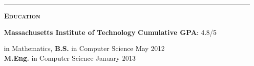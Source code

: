 \documentclass[11 pt]{article}
\begin{document}
\vspace{8pt}

\hrule

\begin{center}\begin{Large}\textsc{\textbf{Education}\\}\end{Large}
\end{center}

\noindent \textbf{Massachusetts Institute of Technology} \hfill \textbf{Cumulative GPA}: 4.8/5 \\
\begin{small}
 in Mathematics, {\bf B.S.} in Computer Science \hfill May 2012 \\
{\bf M.Eng.} in Computer Science \hfill January 2013 \\
\end{small}


\begin{comment}
\begin{small}

 \noindent \textbf{Relevant Technical Coursework:}

\textbf{Physics}:
Physics III (Vibrations and Waves); Classical Mechanics II

 \textbf{Economics}:
 Microeconomics; %
 Networks;
 Robust Mechanism Design;
Game Theory %
Public Finance and Public Policy

 \textbf{Math}:
 \noindent Real Analysis; %
 Linear Algebra and Group Theory; %
 Differential Forms; %
 Combinatorial Analysis;
 Probability and Random Variables;
 Differential Equations;
 Seminar in Logic

\textbf{CS Theory}:
 Networks;
 Design and Analysis of Algorithms; %
 Approximation Algorithms;
 Sub-Linear Algorithms;
 Complexity Theory I and II; %
 Advanced Complexity Theory;
 Quantum Complexity Theory;
 Combinatorial Optimization;
 Cryptography I and II; %
 Modern Developments in Cryptography
 Artificial Intelligence;

 \textbf{CS Systems}:
Intro to EECS I and II;
 Computer Systems Engineering;
 Elements of Software Construction;
 Computation Structures;
 Performance Engineering of Software Systems
 \end{small} \\
\end{comment}
\end{document}
